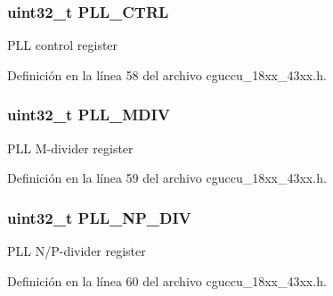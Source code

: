 \subsubsection[{\texorpdfstring{P\+L\+L\+\_\+\+C\+T\+RL}{PLL_CTRL}}]{ uint32\+\_\+t P\+L\+L\+\_\+\+C\+T\+RL}\hypertarget{struct_c_g_u___p_l_l___r_e_g___t_ac44fd1b3cc9c8c43503c5f33bc249629}{}\label{struct_c_g_u___p_l_l___r_e_g___t_ac44fd1b3cc9c8c43503c5f33bc249629}
P\+LL control register 

Definición en la línea 58 del archivo cguccu\+\_\+18xx\+\_\+43xx.\+h.

\subsubsection[{\texorpdfstring{P\+L\+L\+\_\+\+M\+D\+IV}{PLL_MDIV}}]{ uint32\+\_\+t P\+L\+L\+\_\+\+M\+D\+IV}\hypertarget{struct_c_g_u___p_l_l___r_e_g___t_a033ea2de72ec1feb7144e22c774d3a90}{}\label{struct_c_g_u___p_l_l___r_e_g___t_a033ea2de72ec1feb7144e22c774d3a90}
P\+LL M-\/divider register 

Definición en la línea 59 del archivo cguccu\+\_\+18xx\+\_\+43xx.\+h.

\subsubsection[{\texorpdfstring{P\+L\+L\+\_\+\+N\+P\+\_\+\+D\+IV}{PLL_NP_DIV}}]{ uint32\+\_\+t P\+L\+L\+\_\+\+N\+P\+\_\+\+D\+IV}\hypertarget{struct_c_g_u___p_l_l___r_e_g___t_ada13d18ce74e2c10d0e1e6ebb08091ed}{}\label{struct_c_g_u___p_l_l___r_e_g___t_ada13d18ce74e2c10d0e1e6ebb08091ed}
P\+LL N/\+P-\/divider register 

Definición en la línea 60 del archivo cguccu\+\_\+18xx\+\_\+43xx.\+h.

